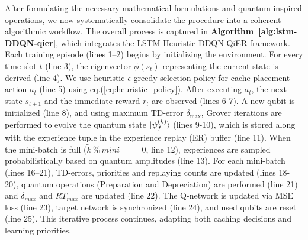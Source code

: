 \documentclass[journal]{IEEEtran}
\begin{document}
After formulating the necessary mathematical formulations and quantum-inspired operations, we now systematically consolidate the procedure into a coherent algorithmic workflow. The overall process is captured in \textbf{Algorithm~\ref{alg:lstm-DDQN-qier}}, which integrates the LSTM-Heuristic-DDQN-QiER framework. Each training episode (lines 1–2) begins by initializing the environment. For every time slot $t$ (line 3), the eigenvector $\phi(s_t)$ representing the current state is derived (line 4). We use heuristic-$\epsilon$-greedy selection policy for cache placement action $a_t$ (line 5) using eq.(\ref{eq:heuristic_policy}). After executing $a_t$, the next state $s_{t+1}$ and the immediate reward $r_t$ are observed (lines 6-7). A new qubit is initialized (line 8), and using maximum TD-error $\delta_{\max}$, Grover iterations are performed to evolve the quantum state $\ket{\psi_f^{(k)}}$ (lines 9-10), which is stored along with the experience tuple in the experience replay (ER) buffer (line 11). When the mini-batch is full ($\tilde{k} \  \% \ mini == 0$, line 12), experiences are sampled probabilistically based on quantum amplitudes (line 13). For each mini-batch (lines 16–21), TD-errors, priorities and replaying counts are updated (lines 18-20), quantum operations (Preparation and Depreciation) are performed (line 21) and $\delta_{max}$ and $RT_{max}$ are updated (line 22). The Q-network is updated via MSE loss (line 23), target network is synchronized (line 24), and used qubits are reset (line 25). This iterative process continues, adapting both caching decisions and learning priorities.




    
\end{document}

